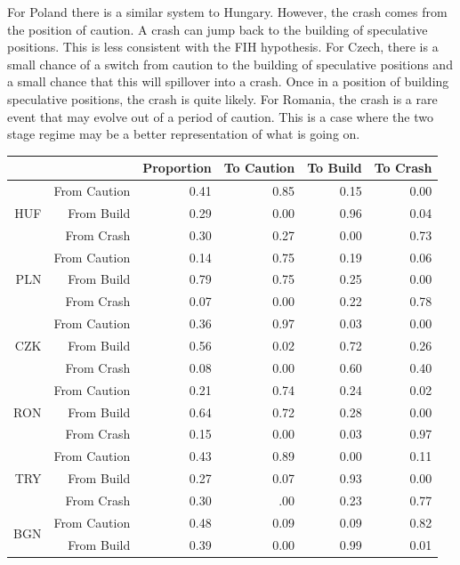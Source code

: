 \documentclass[12pt, a4paper, oneside]{article} %
\begin{document}
For Poland there is a similar system to Hungary.  However, the crash comes from the position of caution.  A crash can jump back to the building of speculative positions.  This is less consistent with the FIH hypothesis. For Czech, there is a small chance of a switch from caution to the building of speculative positions and a small chance that this will spillover into a crash. Once in a position of building speculative positions, the crash is quite likely.  For Romania, the crash is a rare event that may evolve out of a period of caution. This is a case where the two stage regime may be a better representation of what is going on. 
\begin{table}[!h]
\centering
\begin{tabular}{rrrrrr}
  \hline
 & & Proportion & To Caution & To Build & To Crash \\ 
  \hline
\multirow{3}{*}{HUF} & From Caution & 0.41 & 0.85 & 0.15 & 0.00  \\ 
   & From Build & 0.29  & 0.00 & 0.96 & 0.04 \\ 
   & From Crash & 0.30 & 0.27 & 0.00 & 0.73 \\ 
\hline
\multirow{3}{*}{PLN} & From Caution & 0.14 & 0.75 & 0.19 & 0.06 \\ 
   & From Build & 0.79 & 0.75 & 0.25 & 0.00 \\ 
   & From Crash & 0.07 & 0.00 & 0.22 & 0.78 \\ 
\hline
\multirow{3}{*}{CZK}  & From Caution & 0.36 & 0.97 & 0.03 & 0.00 \\ 
   & From Build & 0.56 & 0.02 & 0.72 & 0.26 \\ 
   & From Crash & 0.08 & 0.00 & 0.60 & 0.40 \\ 
\hline
\multirow{3}{*}{RON}& From Caution & 0.21 & 0.74 & 0.24 & 0.02 \\ 
   & From Build & 0.64 & 0.72 & 0.28 & 0.00 \\ 
   & From Crash & 0.15 & 0.00 & 0.03 & 0.97 \\ 
\hline
\multirow{3}{*}{TRY}  & From Caution & 0.43 & 0.89 & 0.00 & 0.11 \\ 
   & From Build & 0.27 & 0.07 & 0.93 & 0.00 \\ 
   & From Crash & 0.30 & .00 & 0.23 & 0.77 \\ 
\hline
\multirow{3}{*}{BGN}  & From Caution & 0.48 & 0.09 & 0.09 & 0.82 \\ 
   & From Build & 0.39 & 0.00 & 0.99 & 0.01 \\ 

\end{tabular}
\end{table}
\end{document}
